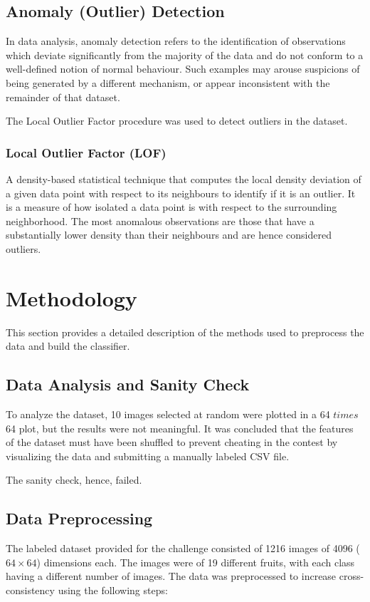 \documentclass[conference]{IEEEtran}
\begin{document}
    \subsection{Anomaly (Outlier) Detection}
    \label{sec:outlier}
    In data analysis, anomaly detection refers to the identification of observations which deviate significantly from the majority of the data and
    do not conform to a well-defined notion of normal behaviour.
    Such examples may arouse suspicions of being generated by a different mechanism, or appear inconsistent with the remainder of that dataset.

    The Local Outlier Factor procedure was used to detect outliers in the dataset.
    \vspace*{3.0pt}

    \subsubsection{Local Outlier Factor (LOF)}
    \label{sec:lof}
    A density-based statistical technique that computes the local density deviation of a given data point with respect to its neighbours to identify if it is an outlier.
    It is a measure of how isolated a data point is with respect to the surrounding neighborhood.
    The most anomalous observations are those that have a substantially lower density than their neighbours and are hence considered outliers.

    \section{Methodology}
    \label{sec:methodology}
    This section provides a detailed description of the methods used to preprocess the data and build the classifier.

    \subsection{Data Analysis and Sanity Check}
    \label{sec:dataanalysis}
    To analyze the dataset, 10 images selected at random were plotted in a 64 $times$ 64 plot, but the results were not meaningful.
    It was concluded that the features of the dataset must have been shuffled to prevent cheating in the contest by visualizing
    the data and submitting a manually labeled CSV file.

    The sanity check, hence, failed.

    \subsection{Data Preprocessing}
    \label{sec:dataprep}
    The labeled dataset provided for the challenge consisted of 1216 images of 4096 ($64 \times 64$) dimensions each.
    The images were of 19 different fruits, with each class having a different number of images.
    The data was preprocessed to increase cross-consistency using the following steps:
\end{document}
